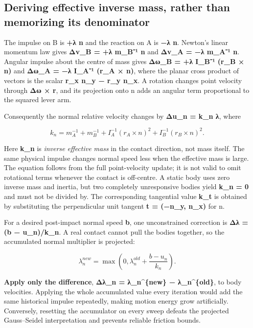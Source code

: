 \subsection{Deriving effective inverse mass, rather than memorizing its denominator}\label{appendix-c9d92e145503-deriving-effective-inverse-mass-rather-than-memorizing-its-denominator}

The impulse on B is \textbf{+λ n} and the reaction on A is \textbf{−λ n}. Newton's linear momentum law gives \textbf{Δv\_B = +λ m\_B⁻¹ n} and \textbf{Δv\_A = −λ m\_A⁻¹ n}. Angular impulse about the centre of mass gives \textbf{Δω\_B = +λ I\_B⁻¹ (r\_B × n)} and \textbf{Δω\_A = −λ I\_A⁻¹ (r\_A × n)}, where the planar cross product of vectors is the scalar \textbf{r\_x n\_y − r\_y n\_x}. A rotation changes point velocity through \textbf{Δω × r}, and its projection onto n adds an angular term proportional to the squared lever arm.

Consequently the normal relative velocity changes by \textbf{Δu\_n = k\_n λ}, where

\[
k_n = m_A^{-1} + m_B^{-1}
    + I_A^{-1}(r_A \times n)^2
    + I_B^{-1}(r_B \times n)^2.
\]

Here \textbf{k\_n} is \emph{inverse effective mass} in the contact direction, not mass itself. The same physical impulse changes normal speed less when the effective mass is large. The equation follows from the full point-velocity update; it is not valid to omit rotational terms whenever the contact is off-centre. A static body uses zero inverse mass and inertia, but two completely unresponsive bodies yield \textbf{k\_n = 0} and must not be divided by. The corresponding tangential value \textbf{k\_t} is obtained by substituting the perpendicular unit tangent \textbf{t = (−n\_y, n\_x)} for n.

For a desired post-impact normal speed \textbf{b}, one unconstrained correction is \textbf{Δλ = (b − u\_n)/k\_n}. A real contact cannot pull the bodies together, so the accumulated normal multiplier is projected:

\[
\lambda_n^{new}=\max\left(0,\lambda_n^{old}
 + \frac{b-u_n}{k_n}\right).
\]

\textbf{Apply only the difference}, \textbf{Δλ\_n = λ\_n\^{}\{new\} − λ\_n\^{}\{old\}}, to body velocities. Applying the whole accumulated value every iteration would add the same historical impulse repeatedly, making motion energy grow artificially. Conversely, resetting the accumulator on every sweep defeats the projected Gauss--Seidel interpretation and prevents reliable friction bounds.

